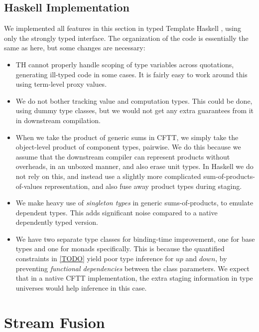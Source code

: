 \documentclass[acmsmall,screen,review,anonymous]{acmart}
\newcommand{\mit}[1]{\mathit{#1}}
\theoremstyle{remark}
\newcommand{\mup}{\mit{up}}
\newcommand{\mdown}{\mit{down}}
\begin{document}
\subsection{Haskell Implementation}

We implemented all features in this section in typed Template Haskell
\cite{TODO}, using only the strongly typed interface. The organization of the
code is essentially the same as here, but some changes are necessary:
\begin{itemize}
  \item TH cannot properly handle scoping of type variables across quotations,
        generating ill-typed code in some cases. It is fairly easy to work around
        this using term-level proxy values.
  \item We do not bother tracking value and computation types. This could be done,
        using dummy type classes, but we would not get any extra guarantees from it
        in downstream compilation.
  \item When we take the product of generic sums in CFTT, we simply take the
        object-level product of component types, pairwise. We do this because we
        assume that the downstream compiler can represent products without
        overheads, in an unboxed manner, and also erase unit types. In Haskell we do
        not rely on this, and instead use a slightly more complicated
        sum-of-products-of-values representation, and also fuse away product types
        during staging.
  \item We make heavy use of \emph{singleton types} \cite{TODO} in generic sums-of-products, to emulate
        dependent types. This adds significant noise compared to a native dependently typed
        version.
  \item We have two separate type classes for binding-time improvement, one for
        base types and one for monads specifically. This is because the quantified
        constraints in \ref{TODO} yield poor type inference for $\mup$ and $\mdown$,
        by preventing \emph{functional dependencies} \cite{TODO} between the class
        parameters. We expect that in a native CFTT implementation, the extra staging
        information in type universes would help inference in this case.
\end{itemize}

\section{Stream Fusion}
\end{document}
